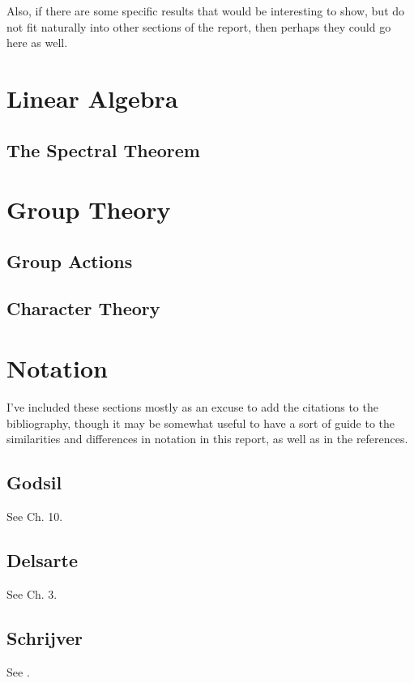 \documentclass{report}
\begin{document}
  Also, if there are some specific results that would be interesting to show,
  but do not fit naturally into other sections of the report, then perhaps they
  could go here as well.

\appendix

\chapter{Linear Algebra}
  \section{The Spectral Theorem}

\chapter{Group Theory}
  \section{Group Actions}

  \section{Character Theory}

\chapter{Notation}
  I've included these sections mostly as an excuse to add the citations to the
  bibliography, though it may be somewhat useful to have a sort of guide to the
  similarities and differences in notation in this report, as well as in the
  references.

  \section{Godsil}
    See \cite{godsil} Ch. 10.

  \section{Delsarte}
    See \cite{delsarte} Ch. 3.

  \section{Schrijver}
    See \cite{schrijver}.

\printbibliography[heading=bibintoc]
\end{document}
